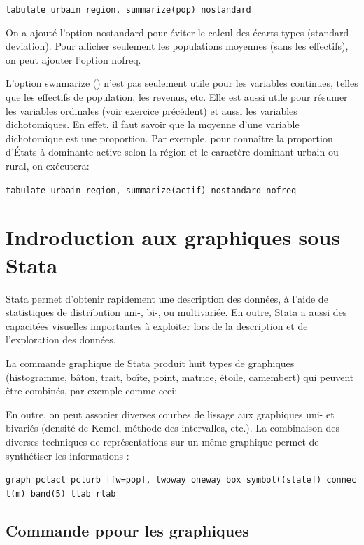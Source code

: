 \documentclass[
]{book}
\begin{document}
\texttt{tabulate\ urbain\ region,\ summarize(pop)\ nostandard}

On a ajouté l'option nostandard pour éviter le calcul des
écarts types (standard deviation). Pour afficher seulement les populations moyennes (sans les effectifs), on peut ajouter
l'option nofreq.

L'option swnmarize () n'est pas seulement utile pour les
variables continues, telles que les effectifs de population, les
revenus, etc. Elle est aussi utile pour résumer les variables
ordinales (voir exercice précédent) et aussi les variables
dichotomiques. En effet, il faut savoir que la moyenne d'une
variable dichotomique est une proportion. Par exemple, pour
connaître la proportion d'États à dominante active selon la région et le caractère dominant urbain ou rural, on exécutera:

\texttt{tabulate\ urbain\ region,\ summarize(actif)\ nostandard\ nofreq}

\hypertarget{indroduction-aux-graphiques-sous-stata}{%
\section{Indroduction aux graphiques sous Stata}\label{indroduction-aux-graphiques-sous-stata}}

Stata permet d'obtenir rapidement une description des données,
à l'aide de statistiques de distribution uni-, bi-, ou multivariée. En outre, Stata a aussi des capacitées visuelles importantes à exploiter lors de la description et de l'exploration des données.

La commande graphique de Stata produit huit types de graphiques (histogramme, bâton, trait, boîte, point, matrice, étoile, camembert) qui peuvent être combinés, par exemple comme ceci:

En outre, on peut associer diverses courbes de lissage aux graphiques uni- et bivariés (densité de Kemel, méthode des intervalles, etc.). La combinaison des diverses techniques de
représentations sur un même graphique permet de synthétiser les informations :

\texttt{graph\ pctact\ pcturb\ {[}fw=pop{]},\ twoway\ oneway\ box\ symbol((state{]})\ connect(m)\ band(5)\ tlab\ rlab}

\hypertarget{commande-ppour-les-graphiques}{%
\subsection{Commande ppour les graphiques}\label{commande-ppour-les-graphiques}}
\end{document}
